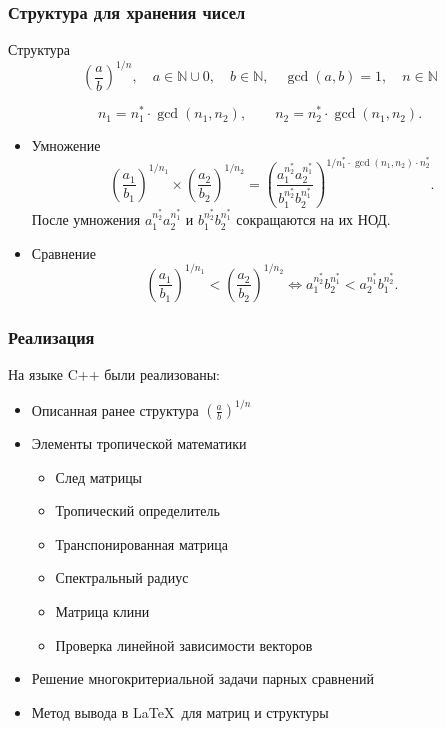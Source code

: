 \documentclass[ucs, notheorems, handout]{beamer}
\begin{document}
\begin{frame}
    \frametitle{Структура для хранения чисел}
    \begin{block}{Структура}
        $$\displaystyle \left(\frac{a}{b}\right)^{1/n}, \quad a \in \mathbb{N} \cup 0, \quad b \in \mathbb{N}, \quad \gcd(a, b) = 1, \quad n \in \mathbb{N}$$
    \end{block}
    $$n_1 =  n^*_1 \cdot \gcd(n_1, n_2), \qquad n_2 =  n^*_2 \cdot \gcd(n_1, n_2).$$
    \begin{itemize}
        \item Умножение
        $$ \left(\frac{a_1}{b_1}\right)^{1/n_1} \times \left(\frac{a_2}{b_2}\right)^{1/n_2} = \left(\frac{a_1^{n^*_2}a_2^{n^*_1}}{b_1^{n^*_2}b_2^{n^*_1}}\right)^{1/n^*_1\cdot \gcd(n_1, n_2) \cdot n^*_2}.$$
        После умножения $a_1^{n^*_2}a_2^{n^*_1}$ и $b_1^{n^*_2}b_2^{n^*_1}$ сокращаются на их НОД.
        \item Сравнение
        $$ \left(\frac{a_1}{b_1}\right)^{1/n_1} < \left(\frac{a_2}{b_2}\right)^{1/n_2} \Leftrightarrow
        {a_1^{n^*_2}}{b_2^{n^*_1}} < {a_2^{n^*_1}}{b_1^{n^*_2}}.$$
    \end{itemize}
\end{frame}

\begin{frame}
    \frametitle{Реализация}
    
    На языке C++ были реализованы:
    \begin{itemize}
        \item Описанная ранее структура $ \left(\frac{a}{b}\right)^{1/n}$
        \item Элементы тропической математики
        \begin{itemize}
            \item След матрицы
            \item Тропический определитель
            \item Транспонированная матрица
            \item Спектральный радиус
            \item Матрица клини
            \item Проверка линейной зависимости векторов
        \end{itemize}
        \item Решение многокритериальной задачи парных сравнений
        \item Метод вывода в \LaTeX \, для матриц и структуры
    \end{itemize}
\end{frame}
\end{document}
